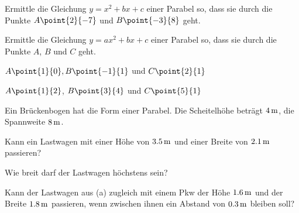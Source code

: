 \documentclass[%
11pt,%
twoside,%
titlepage,%
german,%
headsepline%
]{scrartcl}
\begin{document}
\begin{ueb}
Ermittle die Gleichung $y=x^2+bx+c$ einer Parabel so, dass sie durch die Punkte $A\point{2}{-7}$ und $B\point{-3}{8}$ geht.
\end{ueb}

\begin{ueb}
Ermittle
die Gleichung $y=ax^2+bx+c$ einer Parabel so, dass sie durch die Punkte $A$, $B$ und $C$ geht.
\begin{enumeratea}
\item $A\point{1}{0}, B\point{-1}{1}$ und $C\point{2}{1}$
\item $A\point{1}{2}$, $B\point{3}{4}$ und $C\point{5}{1}$
\end{enumeratea}
\end{ueb}

\begin{ueb}[Lastwagen]
Ein
Br\"uckenbogen hat die Form einer Parabel. Die Scheitelh\"ohe betr\"agt $\unit[4]{m}$, die Spannweite $\unit[8]{m}$.
\begin{enumeratea}
\item Kann ein Lastwagen mit einer H\"ohe von $\unit[3.5]{m}$ und
einer Breite von $\unit[2.1]{m}$ passieren?
\item Wie breit darf der Lastwagen h\"ochstens sein?
\item Kann der Lastwagen aus (a) zugleich mit einem
Pkw der H\"ohe $\unit[1.6]{m}$ und der Breite $\unit[1.8]{m}$ passieren, wenn zwischen ihnen ein Abstand von $\unit[0.3]{m}$ bleiben soll?
\end{enumeratea}
\end{ueb}

\end{document}
